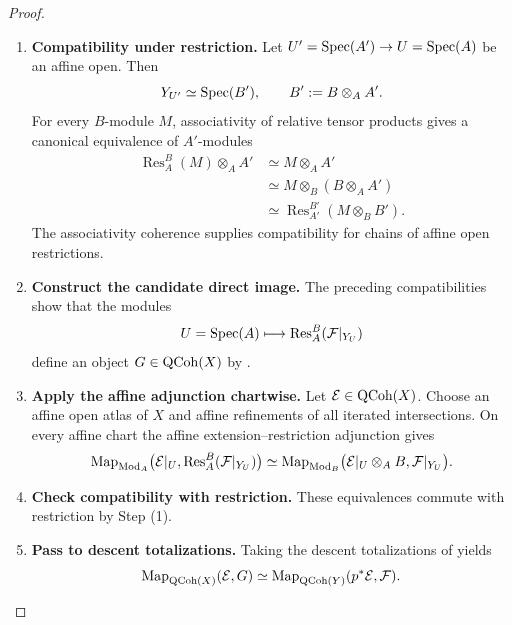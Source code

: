\begin{proof}
\leavevmode
\begin{enumerate}[label=\textup{(\arabic*)}]
    \item \textbf{Compatibility under restriction.}
    Let \(U'=\operatorname{Spec}(A')\to U=\operatorname{Spec}(A)\) be an affine open. Then
    \[
        Y_{U'}
        \simeq
        \operatorname{Spec}(B'),
        \qquad
        B':=B\otimes_AA'.
    \]
    For every \(B\)-module \(M\), associativity of relative tensor products
    gives a canonical equivalence of \(A'\)-modules
    \[
    \begin{aligned}
        \operatorname{Res}_A^B(M)\otimes_AA'
        &\simeq
        M\otimes_AA'
        \\
        &\simeq
        M\otimes_B(B\otimes_AA')
        \\
        &\simeq
        \operatorname{Res}_{A'}^{B'}(M\otimes_BB').
    \end{aligned}
    \]
    The associativity coherence supplies compatibility for chains of affine
    open restrictions.

    \item \textbf{Construct the candidate direct image.}
    The preceding compatibilities show that the modules
    \[
        U=\operatorname{Spec}(A)
        \longmapsto
        \operatorname{Res}_A^B(\mathcal F|_{Y_U})
    \]
    define an object \(G\in\operatorname{QCoh}(X)\) by
    .

    \item \textbf{Apply the affine adjunction chartwise.}
    Let \(\mathcal E\in\operatorname{QCoh}(X)\). Choose an affine open atlas of \(X\)
    and affine refinements of all iterated intersections. On every affine
    chart the affine extension--restriction adjunction gives
    \[
        \operatorname{Map}_{\operatorname{Mod}_A}
        \bigl(\mathcal E|_U,
              \operatorname{Res}_A^B(\mathcal F|_{Y_U})\bigr)
        \simeq
        \operatorname{Map}_{\operatorname{Mod}_B}
        \bigl(\mathcal E|_U\otimes_AB,
              \mathcal F|_{Y_U}\bigr).
    \]

    \item \textbf{Check compatibility with restriction.}
    These equivalences commute with restriction by Step \textup{(1)}.

    \item \textbf{Pass to descent totalizations.}
    Taking the descent totalizations of
     yields
    \[
        \operatorname{Map}_{\operatorname{QCoh}(X)}(\mathcal E,G)
        \simeq
        \operatorname{Map}_{\operatorname{QCoh}(Y)}(p^*\mathcal E,\mathcal F).
    \]


\end{enumerate}
\end{proof}
